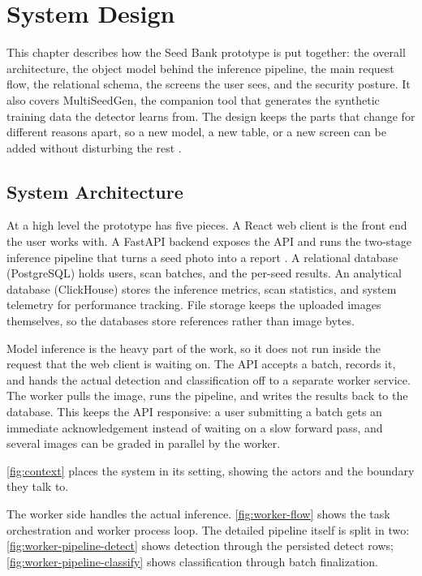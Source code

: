 \chapter{System Design}

This chapter describes how the Seed Bank prototype is put together: the overall
architecture, the object model behind the inference pipeline, the main request
flow, the relational schema, the screens the user sees, and the security posture.
It also covers MultiSeedGen, the companion tool that generates the synthetic
training data the detector learns from. The design keeps the parts that change
for different reasons apart, so a new model, a new table, or a new screen can be
added without disturbing the rest \cite{cleanarchitecture2017}.

\section{System Architecture}

At a high level the prototype has five pieces. A React web client is the front end the user works with. A FastAPI backend exposes the API and runs the two-stage inference pipeline that turns a seed photo into a report \cite{fastapi}. A relational database (PostgreSQL) holds users, scan batches, and the per-seed results. An analytical database (ClickHouse) stores the inference metrics, scan statistics, and system telemetry for performance tracking. File storage keeps the uploaded images themselves, so the databases store references rather than image bytes.

Model inference is the heavy part of the work, so it does not run inside the
request that the web client is waiting on. The API accepts a batch, records it,
and hands the actual detection and classification off to a separate worker
service. The worker pulls the image, runs the pipeline, and writes the results
back to the database. This keeps the API responsive: a user submitting a batch
gets an immediate acknowledgement instead of waiting on a slow forward pass,
and several images can be graded in parallel by the worker.

\autoref{fig:context} places the system in its setting, showing the actors and the boundary they talk to.

The worker side handles the actual inference. \autoref{fig:worker-flow} shows the task orchestration and worker process loop. The detailed pipeline itself is split in two: \autoref{fig:worker-pipeline-detect} shows detection through the persisted detect rows; \autoref{fig:worker-pipeline-classify} shows classification through batch finalization.

